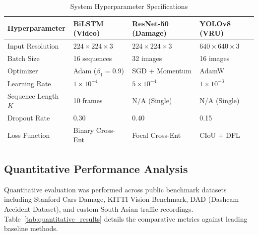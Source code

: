 \documentclass[journal,compsoc]{IEEEtran}
\begin{document}
\begin{table}[htbp]
\centering
\caption{System Hyperparameter Specifications}
\label{tab:hyperparams}
\begin{tabular}{llll}
\toprule
\textbf{Hyperparameter} & \textbf{BiLSTM (Video)} & \textbf{ResNet-50 (Damage)} & \textbf{YOLOv8 (VRU)} \\
\midrule
Input Resolution & $224 \times 224 \times 3$ & $224 \times 224 \times 3$ & $640 \times 640 \times 3$ \\
Batch Size & 16 sequences & 32 images & 16 images \\
Optimizer & Adam ($\beta_1=0.9$) & SGD + Momentum & AdamW \\
Learning Rate & $1 \times 10^{-4}$ & $5 \times 10^{-4}$ & $1 \times 10^{-3}$ \\
Sequence Length $K$ & 10 frames & N/A (Single) & N/A (Single) \\
Dropout Rate & 0.30 & 0.40 & 0.15 \\
Loss Function & Binary Cross-Ent & Focal Cross-Ent & CIoU + DFL \\
\bottomrule
\end{tabular}
\end{table}

\subsection{Quantitative Performance Analysis}
Quantitative evaluation was performed across public benchmark datasets including Stanford Cars Damage, KITTI Vision Benchmark, DAD (Dashcam Accident Dataset), and custom South Asian traffic recordings. Table~\ref{tab:quantitative_results} details the comparative metrics against leading baseline methods.
\end{document}
